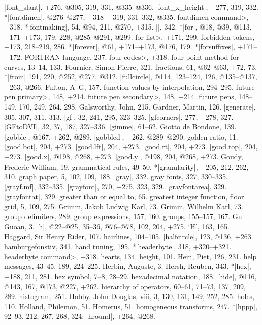 |font_slant|, +276, @305, 319, 331, @335--@336.
|font_x_height|, +277, 319, 332.
*|fontdimen|, @276--@277, +318--+319, 331--332, @335.
\<fontdimen command>, +318.
*|fontmaking|, 54, @94, 211, @270, +315.
|\fontname|, 342.
*|for|, @18, @39, @113, +171--+173, 179, 228, @285--@291, @299.
\<for list>, +171, 299.
forbidden tokens, +173, 218--219, 286.
*|forever|, @61, +171--+173, @176, 179.
*|forsuffixes|, +171--+172.
{\sevenrm FORTRAN} language, 237.
\<four codes>, +318.
four-point method for curves, 13--14, 133.
Fournier, Simon Pierre, 321. %
fractions, 61, @62--@63, +72, 73.
*|from| 191, 220, @252, @277, @312.
|fullcircle|, @114, 123--124, 126, @135--@137, +263, @266.
Fulton, A\period\ G\period, 157.
function values by interpolation, 294--295.
\<future pen primary>, 148, +214.
\<future pen secondary>, 148, +214.
future pens, 148--149, 170, 249, 264, 298.
\newletter
Galsworthy, John, 215.
Gardner, Martin, 126.
|generate|, 305, 307, 311, 313.
|gf|, 32, 241, 295, 323--325.
|gfcorners|, 277, +278, 327.
|GFtoDVI|, 32, 37, 187, 327--336.
|gimme|, 61--62.
Giotto de Bondone, 139.
|gobble|, @167, +262, @289.
|gobbled|, +262, @289--@290.
golden ratio, 11.
|good.bot|, 204, +273.
|good.lft|, 204, +273.
|good.rt|, 204, +273.
|good.top|, 204, +273.
|good.x|, @198, @268, +273.
|good.y|, @198, 204, @268, +273.
Goudy, Frederic William, 19.
grammatical rules, 49--50.
*|granularity|, +205, 212, 262, 310.
graph paper, 5, 102, 109, 188.
|gray|, 332.
gray fonts, 327, 330--335.
|grayf.mf|, 332--335.
|grayfont|, 270, +275, 323, 329.
|grayfontarea|, 329.
|grayfontat|, 329.
greater than or equal to, 65.
greatest integer function, \see floor.
grid, 5, 109, 275.
Grimm, Jakob Ludwig Karl, 73.
Grimm, Wilhelm Karl, 73.
group delimiters, 289.
group expressions, 157, 160.
groups, 155--157, 167.
Gu Guoan, 3.
\newletter
|h|, @22--@25, 35--36, @76--@78, 102, 204, +275.
`H', 163, 165.
Haggard, Sir Henry Rider, 107.
hairlines, 104--105.
|halfcircle|, 123, @136, +263.
hamburgefonstiv, 341.
hand tuning, 195.
*|headerbyte|, 318, +320--+321.
\<headerbyte command>, +318.
hearts, 134.
height, 101.
Hein, Piet, 126, 231.
help messages, 43--45, 189, 224--225.
Herbin, Auguste, 3.
Hersh, Reuben, 343.
*|hex|, +188, 211, 281.
hex symbol, 7--8, 28--29.
hexadecimal notation, 188.
|hide|, @116, @143, 167, @173, @227, +262.
hierarchy of operators, 60--61, 71--73, 137, 209, 289.
histogram, 251.
Hobby, John Douglas, viii, 3, 130, 131, 149, 252, 285.
holes, 110.
Holland, Philemon, 51.
Homerus, 51.
homogeneous transforms, 247.
*|hppp|, 92--93, 212, 267, 268, 324.
|hround|, +264, @268.
